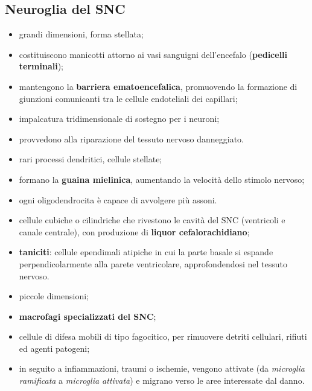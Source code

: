 \subsection{Neuroglia del SNC}

\begin{itemize}
  \item grandi dimensioni, forma stellata;
  \item costituiscono manicotti attorno ai vasi sanguigni dell'encefalo (\textbf{pedicelli terminali});
  \item mantengono la \textbf{barriera ematoencefalica}, promuovendo la formazione di giunzioni comunicanti tra le cellule endoteliali dei capillari;
  \item impalcatura tridimensionale di sostegno per i neuroni;
  \item provvedono alla riparazione del tessuto nervoso danneggiato.
\end{itemize}

\begin{itemize}
  \item rari processi dendritici, cellule stellate;
  \item formano la \textbf{guaina mielinica}, aumentando la velocità dello stimolo nervoso;
  \item ogni oligodendrocita è capace di avvolgere più assoni.
\end{itemize}

\begin{itemize}
  \item cellule cubiche o cilindriche che rivestono le cavità del SNC (ventricoli e canale centrale), con produzione di \textbf{liquor cefalorachidiano};
  \item \textbf{taniciti}: cellule ependimali atipiche in cui la parte basale si espande perpendicolarmente alla parete ventricolare, approfondendosi nel tessuto nervoso.
\end{itemize}

\begin{itemize}
  \item piccole dimensioni;
  \item \textbf{macrofagi specializzati del SNC};
  \item cellule di difesa mobili di tipo fagocitico, per rimuovere detriti cellulari, rifiuti ed agenti patogeni;
  \item in seguito a infiammazioni, traumi o ischemie, vengono attivate (da \textit{microglia ramificata} a \textit{microglia attivata}) e migrano verso le aree interessate dal danno.
\end{itemize}


